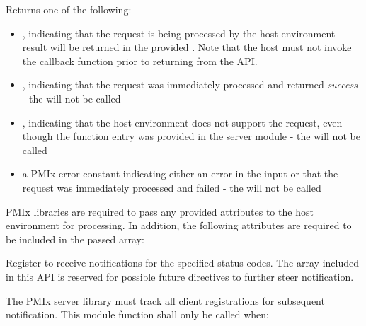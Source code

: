\begin{arglist}
\end{arglist}

Returns one of the following:

\begin{itemize}
    \item {}, indicating that the request is being processed by the host environment - result will be returned in the provided . Note that the host must not invoke the callback function prior to returning from the \ac{API}.
    \item {}, indicating that the request was immediately processed and returned \textit{success} - the  will not be called
    \item {}, indicating that the host environment does not support the request, even though the function entry was provided in the server module - the  will not be called
    \item a PMIx error constant indicating either an error in the input or that the request was immediately processed and failed - the  will not be called
\end{itemize}

\reqattrstart
\ac{PMIx} libraries are required to pass any provided attributes to the host environment for processing. In addition, the following attributes are required to be included in the passed  array:


\reqattrend

\descr

Register to receive notifications for the specified status codes. The  array included in this API is reserved for possible future directives to further steer notification.

\adviceimplstart
The \ac{PMIx} server library must track all client registrations for subsequent notification. This module function shall only be called when:


